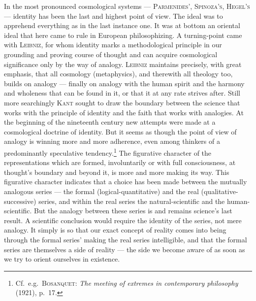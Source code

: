 \documentclass[12pt]{book}
\newcommand{\opage}[1]{\marginnote{\footnotesize\textit{[#1]}}}
\begin{document}
In the most pronounced cosmological systems --- \textsc{Parmenides', Spinoza's,
Hegel's} --- identity has been the last and highest point of view. The ideal was
to apprehend everything as in the last instance one. It was at bottom an oriental
ideal that here came to rule in European philosophizing. A \opage{127}turning-point came with
\textsc{Leibniz}, for whom identity marks a methodological principle in our
grounding and proving course of thought and can acquire cosmological significance
only by the way of analogy. \textsc{Leibniz} maintains precisely, with great
emphasis, that all cosmology (metaphysics), and therewith all theology too, builds
on analogy --- finally on analogy with the human spirit and the harmony and
wholeness that can be found in it, or that it at any rate strives after. Still
more searchingly \textsc{Kant} sought to draw the boundary between the science
that works with the principle of identity and the faith that works with analogies.
At the beginning of the nineteenth century new attempts were made at a cosmological
doctrine of identity. But it seems as though the point of view of analogy is
winning more and more adherence, even among thinkers of a predominantly
speculative tendency.\footnote{Cf.\ e.g.\ \textsc{Bosanquet:} \textit{The meeting
of extremes in contemporary philosophy} (1921), p.\ 17.} The figurative character
of the representations which are formed, involuntarily or with full consciousness,
at thought's boundary and beyond it, is more and more making its way. This
figurative character indicates that a choice has been made between the mutually
analogous series --- the formal (logical-quantitative) and the real
(qualitative-successive) series, and within the real series the natural-scientific
and the human-scientific. But the analogy between these series is and remains
science's last result. A scientific conclusion would require the identity of the
series, not mere analogy. It simply is so that our exact concept of reality comes
into being through the formal series' making the real series intelligible, and
that the formal series are themselves a side of reality --- the side we become
aware of as soon as we try to orient ourselves in existence.
\end{document}
